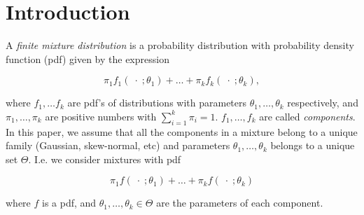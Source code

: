 \documentclass[10pt, a4paper]{article}
\begin{document}

\section{Introduction}

\noindent  A \emph{finite mixture distribution} is a probability distribution with probability density function (pdf) given by the expression

\[
\pi_1 f_1(\;\cdot\; ; \theta_1) + \dots + \pi_k f_k(\;\cdot\; ; \theta_k),
\]

where $f_1, \dots f_k$ are pdf's of distributions with parameters $\theta_1, \dots, \theta_k$ respectively, and $\pi_1, \dots, \pi_k$ are positive numbers with $\sum_{i=1}^k \pi_i = 1$. $f_1, \dots, f_k$ are called \emph{components}. In this paper, we assume that all the components in a mixture belong to a unique family (Gaussian, skew-normal, etc) and parameters $\theta_1, \dots, \theta_k$ belongs to a unique set $\Theta$. I.e. we consider mixtures with pdf

\begin{equation}\label{mixt}
\pi_1 f(\;\cdot\; ; \theta_1) + \dots + \pi_k f(\;\cdot\; ; \theta_k)
\end{equation}

where $f$ is a pdf, and $\theta_1, \dots, \theta_k \in \Theta$ are the parameters of each component.
\end{document}
